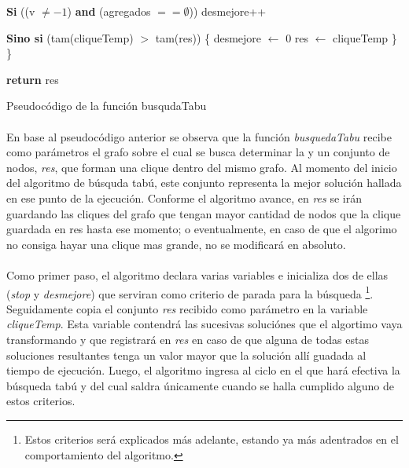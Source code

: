 \begin{algorithm}[H]
	\BlankLine \BlankLine		
	\tab \textbf{Si} ((v $\neq -1$) \textbf{and} (agregados $== \emptyset$)) 				
	\tab \tab desmejore++																
	
	\BlankLine \BlankLine
	\tab \textbf{Sino si} (tam(cliqueTemp) $>$ tam(res)) \{								
	\tab \tab desmejore $\leftarrow$ 0													
	\tab \tab res $\leftarrow$ cliqueTemp												
	\tab \} \\
	\}
	
	\BlankLine \BlankLine		
	\textbf{return} res																	
\caption{Pseudocódigo de la función busqudaTabu} 
\normalsize
\end{algorithm}

\paragraph{}
En base al pseudocódigo anterior se observa que la función \textit{busquedaTabu} recibe como parámetros el grafo sobre el cual se busca determinar la \mc y un conjunto de nodos, \textit{res}, que forman una clique dentro del mismo grafo. Al momento del inicio del algoritmo de búsquda tabú, este conjunto representa la mejor solución hallada en ese punto de la ejecución. Conforme el algoritmo avance, en \textit{res} se irán guardando las cliques del grafo que tengan mayor cantidad de nodos que la clique guardada en res hasta ese momento; o eventualmente, en caso de que el algorimo no consiga hayar una clique mas grande, no se modificará en absoluto.

\paragraph{}
Como primer paso, el algoritmo declara varias variables e inicializa dos de ellas (\textit{stop} y \textit{desmejore}) que serviran como criterio de parada para la búsqueda \footnote{Estos criterios será explicados más adelante, estando ya más adentrados en el comportamiento del algoritmo.}. Seguidamente copia el conjunto \textit{res} recibido como parámetro en la variable \textit{cliqueTemp}. Esta variable contendrá las sucesivas soluciónes que el algortimo vaya transformando y que registrará en \textit{res} en caso de que alguna de todas estas soluciones resultantes tenga un valor mayor que la solución allí guadada al tiempo de ejecución. Luego, el algoritmo ingresa al ciclo en el que hará efectiva la búsqueda tabú y del cual saldra únicamente cuando se halla cumplido alguno de estos criterios.  

